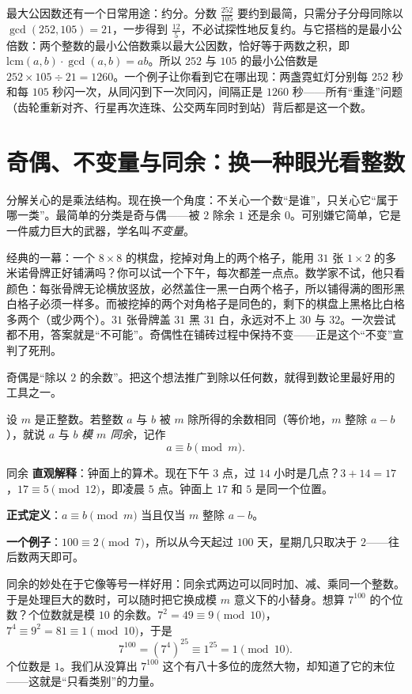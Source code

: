 最大公因数还有一个日常用途：约分。分数 $\frac{252}{105}$ 要约到最简，只需分子分母同除以 $\gcd(252,105)=21$，一步得到 $\frac{12}{5}$，不必试探性地反复约。与它搭档的是最小公倍数：两个整数的最小公倍数乘以最大公因数，恰好等于两数之积，即 $\mathrm{lcm}(a,b)\cdot\gcd(a,b)=ab$。所以 $252$ 与 $105$ 的最小公倍数是 $252\times105\div21=1260$。一个例子让你看到它在哪出现：两盏霓虹灯分别每 $252$ 秒和每 $105$ 秒闪一次，从同闪到下一次同闪，间隔正是 $1260$ 秒——所有“重逢”问题（齿轮重新对齐、行星再次连珠、公交两车同时到站）背后都是这一个数。

\section{奇偶、不变量与同余：换一种眼光看整数}

分解关心的是乘法结构。现在换一个角度：不关心一个数“是谁”，只关心它“属于哪一类”。最简单的分类是奇与偶——被 $2$ 除余 $1$ 还是余 $0$。可别嫌它简单，它是一件威力巨大的武器，学名叫\emph{不变量}。

经典的一幕：一个 $8\times8$ 的棋盘，挖掉对角上的两个格子，能用 $31$ 张 $1\times2$ 的多米诺骨牌正好铺满吗？你可以试一个下午，每次都差一点点。数学家不试，他只看颜色：每张骨牌无论横放竖放，必然盖住一黑一白两个格子，所以铺得满的图形黑白格子必须一样多。而被挖掉的两个对角格子是同色的，剩下的棋盘上黑格比白格多两个（或少两个）。$31$ 张骨牌盖 $31$ 黑 $31$ 白，永远对不上 $30$ 与 $32$。一次尝试都不用，答案就是“不可能”。奇偶性在铺砖过程中保持不变——正是这个“不变”宣判了死刑。

奇偶是“除以 $2$ 的余数”。把这个想法推广到除以任何数，就得到数论里最好用的工具之一。

\begin{dingyi}[同余]
设 $m$ 是正整数。若整数 $a$ 与 $b$ 被 $m$ 除所得的余数相同（等价地，$m$ 整除 $a-b$），就说 $a$ 与 $b$ \emph{模 $m$ 同余}，记作
\[
a\equiv b\pmod{m}.
\]
\end{dingyi}

\begin{shuyu}{同余}
\textbf{直观解释}：钟面上的算术。现在下午 $3$ 点，过 $14$ 小时是几点？$3+14=17$，$17\equiv5\pmod{12}$，即凌晨 $5$ 点。钟面上 $17$ 和 $5$ 是同一个位置。

\textbf{正式定义}：$a\equiv b\pmod{m}$ 当且仅当 $m$ 整除 $a-b$。

\textbf{一个例子}：$100\equiv2\pmod{7}$，所以从今天起过 $100$ 天，星期几只取决于 $2$——往后数两天即可。
\end{shuyu}

同余的妙处在于它像等号一样好用：同余式两边可以同时加、减、乘同一个整数。于是处理巨大的数时，可以随时把它换成模 $m$ 意义下的小替身。想算 $7^{100}$ 的个位数？个位数就是模 $10$ 的余数。$7^2=49\equiv9\pmod{10}$，$7^4\equiv9^2=81\equiv1\pmod{10}$，于是
\[
7^{100}=(7^4)^{25}\equiv 1^{25}=1\pmod{10}.
\]
个位数是 $1$。我们从没算出 $7^{100}$ 这个有八十多位的庞然大物，却知道了它的末位——这就是“只看类别”的力量。

